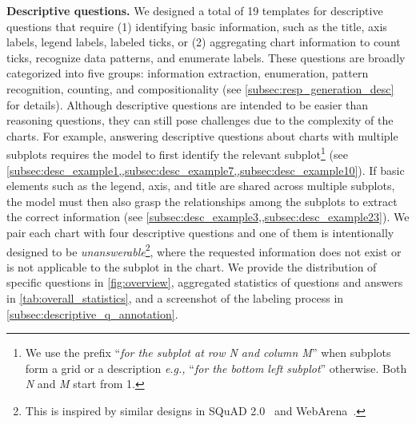 \textbf{Descriptive questions.  }
We designed a total of 19 templates for descriptive questions that require (1) identifying basic information, such as the title, axis labels, legend labels, labeled ticks, or (2) aggregating chart information to count ticks, recognize data patterns, and enumerate labels.
These questions are broadly categorized into five groups: information extraction, enumeration, pattern recognition, counting, and compositionality (see \cref{subsec:resp_generation_desc} for details). 
Although descriptive questions are intended to be easier than reasoning questions, they can still pose challenges due to the complexity of the charts. 
For example, answering descriptive questions about charts with multiple subplots requires the model to first identify the relevant subplot\footnote{We use the prefix ``\textit{for the subplot at row N and column M}'' when subplots form a grid or a description \textit{e.g.,} ``\textit{for the bottom left subplot}'' otherwise. Both \textit{N} and \textit{M} start from 1.} (see \cref{subsec:desc_example1,,subsec:desc_example7,,subsec:desc_example10}).
If basic elements such as the legend, axis, and title are shared across multiple subplots, the model must then also grasp the relationships among the subplots to extract the correct information (see \cref{subsec:desc_example3,,subsec:desc_example23}). %
We pair each chart with four descriptive questions and one of them is intentionally designed to be \emph{unanswerable}\footnote{This is inspired by similar designs in SQuAD 2.0~\cite{rajpurkar2018know} and WebArena~\cite{zhou2023webarena}.}, where the requested information does not exist or is not applicable to the subplot in the chart.
We provide the distribution of specific questions in \cref{fig:overview}, aggregated statistics of questions and answers in \cref{tab:overall_statistics}, and a screenshot of the labeling process in \cref{subsec:descriptive_q_annotation}.

